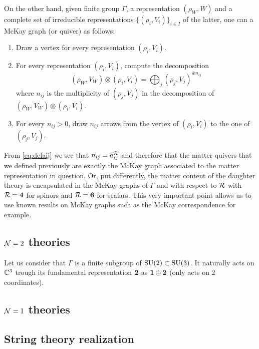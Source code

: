 \documentclass[a4paper,11pt]{article}
\begin{document}
        On the other hand, given finite group $\Gamma$, a representation $(\rho_W,W)$ and a complete set of irreducible representations $\{(\rho_i,V_i)\}_{i\in I}$ of the latter, one can a McKay graph (or quiver) as follows:
        \begin{enumerate}
            \item Draw a vertex for every representation $(\rho_i,V_i)$.
            \item For every representation $(\rho_i,V_i)$, compute the decomposition
            \begin{equation*}
                (\rho_W,V_W)\otimes(\rho_i,V_i)=\bigoplus_j (\rho_j,V_j)^{\oplus n_{ij}}
            \end{equation*}
            where $n_{ij}$ is the multiplicity of $(\rho_j,V_j)$ in the decomposition of $(\rho_W,V_W)\otimes(\rho_i,V_i)$.
            \item For every $n_{ij}>0$, draw $n_{ij}$ arrows from the vertex of $(\rho_i,V_i)$ to the one of $(\rho_j,V_j)$.
        \end{enumerate}
        
        From \eqref{eq:defaij} we see that $n_{ij}=a^{\mathcal{R}}_{ij}$ and therefore that the matter quivers that we defined previously are exactly the McKay graph associated to the matter representation in question. Or, put differently, the matter content of the daughter theory is encapsulated in the McKay graphs of $\Gamma$ and with respect to $\mathcal{R}$ with $\mathcal{R}=\boldsymbol{4}$ for spinors and $\mathcal{R}=\boldsymbol{6}$ for scalars. This very important point allows us to use known results on McKay graphs such as the McKay correspondence for example.

    \subsection{$\mathcal{N}=2$ theories}

        Let us consider that $\Gamma$ is a finite subgroup of $\text{SU}(2)\subset\text{SU}(3)$. It naturally acts on $\mathbb{C}^3$ trough its fundamental representation $\boldsymbol{2}$ as $\boldsymbol{1}\oplus\boldsymbol{2}$ (only acts on 2 coordinates).

    \subsection{$\mathcal{N}=1$ theories}

    \subsection{String theory realization}
\end{document}
